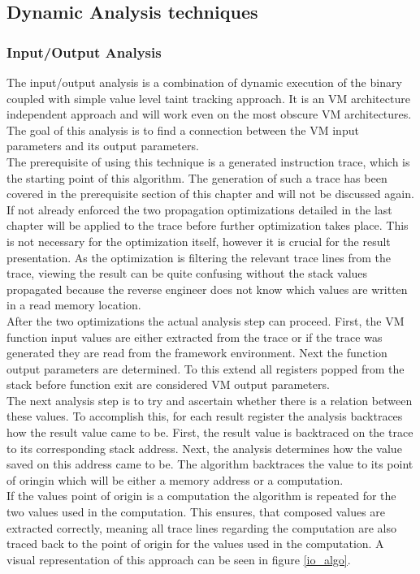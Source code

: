 \documentclass[10pt,twoside,a4paper,bibliography=totoc]{scrbook}
\begin{document}
\subsection{Dynamic Analysis techniques}
\label{sec3:anal}
\subsubsection{Input/Output Analysis}

The input/output analysis is a combination of dynamic execution of the binary coupled with simple value level taint tracking approach. It is an VM architecture independent approach and will work even on the most obscure VM architectures. The goal of this analysis is to find a connection between the VM input parameters and its output parameters.\\
The prerequisite of using this technique is a generated instruction trace, which is the starting point of this algorithm. The generation of such a trace has been covered in the prerequisite section of this chapter and will not be discussed again.\\
If not already enforced the two propagation optimizations detailed in the last chapter will be applied to the trace before further optimization takes place.
This is not necessary for the optimization itself, however it is crucial for the result presentation.
As the optimization is filtering the relevant trace lines from the trace, viewing the result can be quite confusing without the stack values propagated because the reverse engineer does not know which values are written in a read memory location. \\
After the two optimizations the actual analysis step can proceed. First, the VM function input values are either extracted from the trace or if the trace was generated they are read from the framework environment.
Next the function output parameters are determined. To this extend all registers popped from the stack before function exit are considered VM output parameters.\\
The next analysis step is to try and ascertain whether there is a relation between these values. To accomplish this, for each result register the analysis backtraces how the result value came to be. First, the result value is backtraced on the trace to its corresponding stack address. Next, the analysis determines how the value saved on this address came to be. The algorithm backtraces the value to its point of oringin which will be either a memory address or a computation.\\
If the values point of origin is a computation the algorithm is repeated for the two values used in the computation. This ensures, that composed values are extracted correctly, meaning all trace lines regarding the computation are also traced back to the point of origin for the values used in the computation. 
A visual representation of this approach can be seen in figure \ref{io_algo}.
\end{document}
